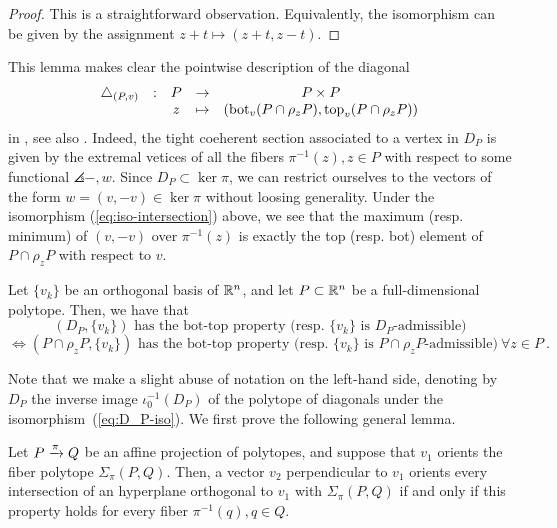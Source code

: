 \begin{proof}
	This is a straightforward observation.
	Equivalently, the isomorphism can be given by the assignment $z+t \mapsto (z+t,z-t)$.
\end{proof}

This lemma makes clear the pointwise description of the diagonal
\begin{equation*}
	\begin{matrix}
		\triangle_{(P,v)} & : & P & \to & P \times P \\
		& & z  & \mapsto & (\operatorname{bot}_v(P \cap \rho_z P),\operatorname{top}_v(P \cap \rho_z P))
	\end{matrix}
\end{equation*}
in \cite[Definition 10]{MTTV19}, see also \cite[Proposition 1.15]{GLA21}.
Indeed, the tight coeherent section associated to a vertex in $D_P$ is given by the extremal vetices of all the fibers $\pi^{-1}(z), z \in P$ with respect to some functional $\angles{-,w}$.
Since $D_P \subset \ker \pi$, we can restrict ourselves to the vectors of the form $w=(v,-v) \in \ker \pi$ without loosing generality.
Under the isomorphism (\ref{eq:iso-intersection}) above, we see that the maximum (resp. minimum) of $(v,-v)$ over $\pi^{-1}(z)$ is exactly the top (resp. bot) element of $P\cap \rho_z P$ with respect to $v$.


\begin{lemma} \label{l:bot-top-for-DP}
	Let $\{v_k\}$ be an orthogonal basis of $\mathbb{R}^n$, and let $P\subset \mathbb{R}^n$ be a full-dimensional polytope.
	Then, we have that
	\[
	(D_P,\{v_k\}) \text{ has the bot-top property (resp. } \{v_k\} \text{ is }D_P\text{-admissible)}
	\]
	\[
	\iff (P\cap \rho_z P,\{v_k\}) \text{ has the bot-top property (resp. } \{v_k\} \text{ is }P\cap \rho_z P\text{-admissible)} \ \forall z \in P \ .
	\]
\end{lemma}

Note that we make a slight abuse of notation on the left-hand side, denoting by $D_P$ the inverse image $\iota_0^{-1}(D_P)$ of the polytope of diagonals under the isomorphism~(\ref{eq:D_P-iso}).
We first prove the following general lemma.

\begin{lemma} \label{lemma:iterated-orientation}
	Let $P\xrightarrow{\pi} Q$ be an affine projection of polytopes, and suppose that $v_1$ orients the fiber polytope $\Sigma_\pi (P,Q)$.
	Then, a vector $v_2$ perpendicular to $v_1$ orients every intersection of an hyperplane orthogonal to $v_1$ with $\Sigma_\pi (P,Q)$ if and only if this property holds for every fiber $\pi^{-1}(q), q \in Q$.
\end{lemma}

